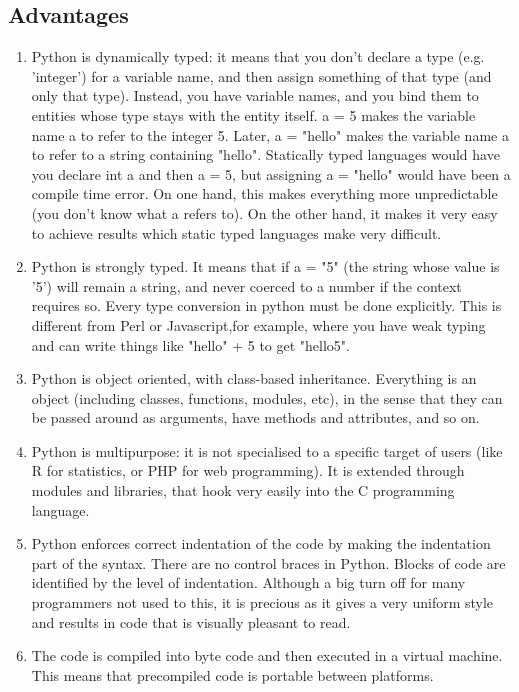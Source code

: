     \subsection{Advantages}
        \begin{enumerate}
           \item Python is dynamically typed: it means that you don't declare a type (e.g. 'integer') for a variable name, and then assign something of that type (and only that type). Instead, you have variable names, and you bind them to entities whose type stays with the entity itself. a = 5 makes the variable name a to refer to the integer 5. Later, a = "hello" makes the variable name a to refer to a string containing "hello". Statically typed languages would have you declare int a and then a = 5, but assigning a = "hello" would have been a compile time error. On one hand, this makes everything more unpredictable (you don't know what a refers to). On the other hand, it makes it very easy to achieve results which static typed languages make very difficult.
           \item Python is strongly typed. It means that if a = "5" (the string whose value is '5') will remain a string, and never coerced to a number if the context requires so. Every type conversion in python must be done explicitly. This is different from Perl or Javascript,for example, where you have weak typing and can write things like "hello" + 5 to get "hello5".
           \item Python is object oriented, with class-based inheritance. Everything is an object (including classes, functions, modules, etc), in the sense that they can be passed around as arguments, have methods and attributes, and so on.
           \item Python is multipurpose: it is not specialised to a specific target of users (like R for statistics, or PHP for web programming). It is extended through modules and libraries, that hook very easily into the C programming language.
           \item Python enforces correct indentation of the code by making the indentation part of the syntax. There are no control braces in Python. Blocks of code are identified by the level of indentation. Although a big turn off for many programmers not used to this, it is precious as it gives a very uniform style and results in code that is visually pleasant to read.
           \item The code is compiled into byte code and then executed in a virtual machine. This means that precompiled code is portable between platforms.
        \end{enumerate}
        
